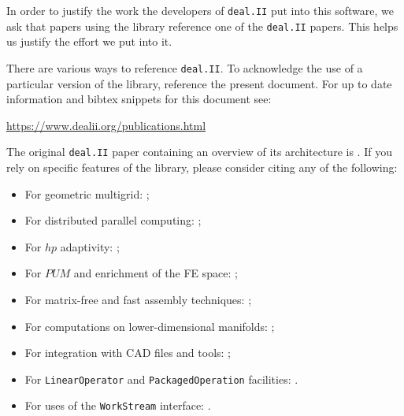 \documentclass{ansarticle-preprint}
\newcommand{\specialword}[1]{\texttt{#1}}
\newcommand{\dealii}{{\specialword{deal.II}}}
\begin{document}
In order to justify the work the developers of \dealii{} put into this
software, we ask that papers using the library reference one of the
\dealii{} papers. This helps us justify the effort we put into it.

There are various ways to reference \dealii{}. To acknowledge the use of a
particular version of the library, reference the present document. For up
to date information and bibtex snippets for this document see:
\begin{center}
 \url{https://www.dealii.org/publications.html}
\end{center}


The original \texttt{\dealii{}} paper containing an overview of its
architecture is \cite{BangerthHartmannKanschat2007}. If you rely on specific
features of the library, please consider citing any of the following:
\begin{itemize}
 \item For geometric multigrid: \cite{Kanschat2004,JanssenKanschat2011};
 \item For distributed parallel computing: \cite{BangerthBursteddeHeisterKronbichler11};
 \item For $hp$ adaptivity: \cite{BangerthKayserHerold2007};
  \item For $PUM$ and enrichment of the FE space: \cite{Davydov2016};
 \item For matrix-free and fast assembly techniques:
   \cite{KronbichlerKormann2012};
 \item For computations on lower-dimensional manifolds:
   \cite{DeSimoneHeltaiManigrasso2009};
 \item For integration with CAD files and tools:
   \cite{HeltaiMola2015};
 \item For \texttt{LinearOperator} and \texttt{PackagedOperation} facilities:
   \cite{MaierBardelloniHeltai-2016-a,MaierBardelloniHeltai-2016-b}.
 \item For uses of the \texttt{WorkStream} interface:
   \cite{TKB16}.
\end{itemize}
\end{document}
